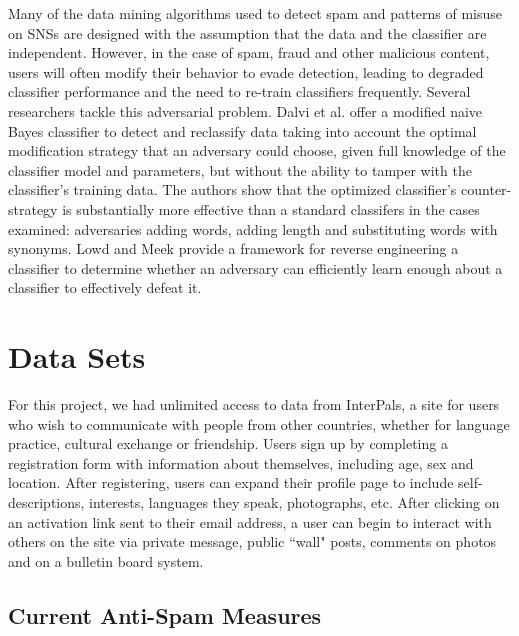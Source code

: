 \documentclass[preprint]{acm_proc_article-sp}
\begin{document}
Many of the data mining algorithms used to detect spam and patterns of misuse 
on SNSs are designed with the assumption that the data and the classifier are 
independent. However, in the case of spam, fraud and other malicious content, 
users will often modify their behavior to evade detection, leading to degraded 
classifier performance and the need to re-train classifiers frequently. Several 
researchers tackle this adversarial problem. Dalvi et al. \cite{dalvi} offer a 
modified naive Bayes classifier to detect and reclassify data taking into account 
the optimal modification strategy that an adversary could choose, given full knowledge of 
the classifier model and parameters, but without the ability to tamper with the 
classifier's training data. The authors show that the optimized classifier's counter-strategy 
is substantially more effective than a standard classifers in the cases examined: 
adversaries adding words, adding length and substituting words with synonyms. 
Lowd and Meek \cite{lowd} provide a framework for reverse engineering a 
classifier to determine whether an adversary can efficiently learn enough 
about a classifier to effectively defeat it.

\section{Data Sets}

For this project, we had unlimited access to data from InterPals, a site for users who 
wish to communicate with people from other countries, whether for language practice, cultural 
exchange or friendship. Users sign up by completing a registration form with 
information about themselves, including age, sex and location. After registering, users 
can expand their profile page to include self-descriptions, interests, languages they speak,  
photographs, etc. After clicking on an activation link sent to their email address, a user can 
begin to interact with others on the site via private message, public ``wall" posts, comments 
on photos and on a bulletin board system.

\subsection{Current Anti-Spam Measures}
\end{document}
